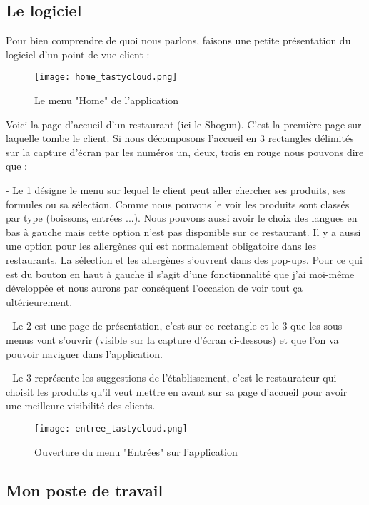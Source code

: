 \subsection{Le logiciel}

Pour bien comprendre de quoi nous parlons, faisons une petite présentation du logiciel d'un point de vue client :

\begin{figure}[!htb]
  \centering
  \texttt{[image: home\_tastycloud.png]}
  \caption{Le menu "Home" de l'application}
  \label{fig:boat1}
\end{figure}

Voici la page d'accueil d'un restaurant (ici le Shogun). C'est la première page sur laquelle tombe le client. Si nous décomposons l'accueil en 3 rectangles délimités sur la capture d'écran par les numéros un, deux, trois en rouge nous pouvons dire que :

- Le 1 désigne le menu sur lequel le client peut aller chercher ses produits, ses formules ou sa sélection. Comme nous pouvons le voir les produits sont classés par type (boissons, entrées ...). Nous pouvons aussi avoir le choix des langues en bas à gauche mais cette option n'est pas disponible sur ce restaurant. Il y a aussi une option pour les allergènes qui est normalement obligatoire dans les restaurants. La sélection et les allergènes s'ouvrent dans des pop-ups. Pour ce qui est du bouton en haut à gauche il s'agit d'une fonctionnalité que j'ai moi-même développée et nous aurons par conséquent l'occasion de voir tout ça ultérieurement.

- Le 2 est une page de présentation, c'est sur ce rectangle et le 3 que les sous menus vont s'ouvrir (visible sur la capture d'écran ci-dessous) et que l'on va pouvoir naviguer dans l'application.

- Le 3 représente les suggestions de l'établissement, c'est le restaurateur qui choisit les produits qu'il veut mettre en avant sur sa page d'accueil pour avoir une meilleure visibilité des clients.

\begin{figure}[!htb]
  \centering
  \texttt{[image: entree\_tastycloud.png]}
  \caption{Ouverture du menu "Entrées" sur l'application}
  \label{fig:boat1}
\end{figure}

\subsection{Mon poste de travail}

